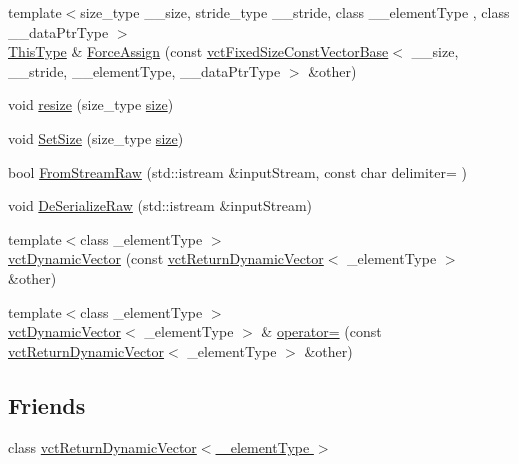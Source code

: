 \begin{DoxyCompactItemize}
\item 
{\footnotesize template$<$size\+\_\+type \+\_\+\+\_\+size, stride\+\_\+type \+\_\+\+\_\+stride, class \+\_\+\+\_\+element\+Type , class \+\_\+\+\_\+data\+Ptr\+Type $>$ }\\\hyperlink{classvct_dynamic_const_vector_base_a39da273523717f678f54d3321ebca3dd}{This\+Type} \& \hyperlink{classvct_dynamic_vector_a0369d655d813f1cdba479b21cd2449f9}{Force\+Assign} (const \hyperlink{classvct_fixed_size_const_vector_base}{vct\+Fixed\+Size\+Const\+Vector\+Base}$<$ \+\_\+\+\_\+size, \+\_\+\+\_\+stride, \+\_\+\+\_\+element\+Type, \+\_\+\+\_\+data\+Ptr\+Type $>$ \&other)
\item 
void \hyperlink{classvct_dynamic_vector_a12a587a4033a2368c7d903b264c76b11}{resize} (size\+\_\+type \hyperlink{classvct_dynamic_const_vector_base_a79950d8cced7fd4e790d9ac2ca1c43a7}{size})
\item 
void \hyperlink{classvct_dynamic_vector_ad48b540760581f3c6b7beeb19e6220f2}{Set\+Size} (size\+\_\+type \hyperlink{classvct_dynamic_const_vector_base_a79950d8cced7fd4e790d9ac2ca1c43a7}{size})
\item 
bool \hyperlink{classvct_dynamic_vector_a3eaaf7e4a316d8b049157508757e5c66}{From\+Stream\+Raw} (std\+::istream \&input\+Stream, const char delimiter= \textquotesingle{} \textquotesingle{})
\item 
void \hyperlink{classvct_dynamic_vector_ac0e182cb025b788147fbb209da1ff8c5}{De\+Serialize\+Raw} (std\+::istream \&input\+Stream)
\item 
{\footnotesize template$<$class \+\_\+element\+Type $>$ }\\\hyperlink{classvct_dynamic_vector_a71dd4898b371e6d4b613e39908cd4c28}{vct\+Dynamic\+Vector} (const \hyperlink{classvct_return_dynamic_vector}{vct\+Return\+Dynamic\+Vector}$<$ \+\_\+element\+Type $>$ \&other)
\item 
{\footnotesize template$<$class \+\_\+element\+Type $>$ }\\\hyperlink{classvct_dynamic_vector}{vct\+Dynamic\+Vector}$<$ \+\_\+element\+Type $>$ \& \hyperlink{classvct_dynamic_vector_a7c7c5f458ab71b68d31ad603caad10b8}{operator=} (const \hyperlink{classvct_return_dynamic_vector}{vct\+Return\+Dynamic\+Vector}$<$ \+\_\+element\+Type $>$ \&other)
\end{DoxyCompactItemize}
\subsection*{Friends}
\begin{DoxyCompactItemize}
\item 
class \hyperlink{classvct_dynamic_vector_adf7a81f9466b24ae64c58cb6be285250}{vct\+Return\+Dynamic\+Vector$<$ \+\_\+element\+Type $>$}
\end{DoxyCompactItemize}
